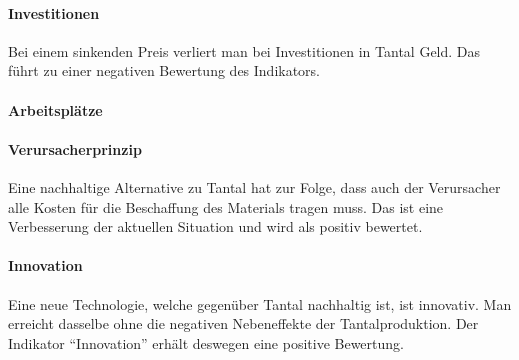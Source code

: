 \paragraph{Investitionen}
Bei einem sinkenden Preis verliert man bei Investitionen in Tantal Geld. Das
führt zu einer negativen Bewertung des Indikators.

\paragraph{Arbeitsplätze}

\paragraph{Verursacherprinzip}
Eine nachhaltige Alternative zu Tantal hat zur Folge, dass auch der Verursacher
alle Kosten für die Beschaffung des Materials tragen muss. Das ist eine
Verbesserung der aktuellen Situation und wird als positiv bewertet.

\paragraph{Innovation}
Eine neue Technologie, welche gegenüber Tantal nachhaltig ist, ist innovativ.
Man erreicht dasselbe ohne die negativen Nebeneffekte der Tantalproduktion. Der
Indikator ``Innovation'' erhält deswegen eine positive Bewertung.

\fi
